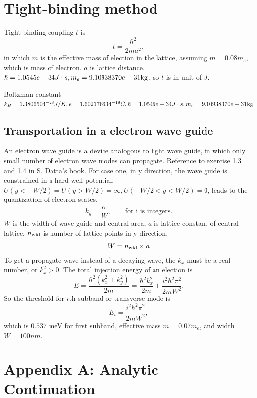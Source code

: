 \documentclass[aps,prb,superscriptaddress]{revtex4-2}
\begin{document}
\section{Tight-binding method}
Tight-binding coupling $t$ is 
\[
t = \frac{\hbar^{2}}{2ma^{2}},
\]
in which $m$ is the effective mass of election in the lattice, assuming $m=0.08m_{e}$, which is mass of electron. $a$ is lattice distance. $\hbar = 1.0545e-34J\cdot s, m_e = 9.10938370e-31\rm{kg}$, so $t$ is in unit of $J$.

Boltzman constant $k_B = 1.3806504^{-23}J/K, e = 1.602176634^{-19}C, \hbar = 1.0545e-34J\cdot s, m_e = 9.10938370e-31\rm{kg}$
\subsection{Transportation in a electron wave guide} 
An electron wave guide is a device analogous to light wave guide, in which only small number of electron wave modes can propagate. Reference to exercise 1.3 and 1.4 in S. Datta's book. For case one, in y direction, the wave guide is constrained in a hard-well potential. $U(y < -W/2) = U(y > W/2) = \infty, U(-W/2 < y < W/2) = 0$, leads to the quantization of electron states.
\begin{equation}
k_{y} = \frac{i\pi}{W}, \qquad \text{for i is integers.}
\end{equation}
$W$ is the width of wave guide and central area, $a$ is lattice constant of central lattice, $n_{\rm{wid}}$ is number of lattice points in y direction.
\begin{equation}
W = n_{\rm{wid}}\times a
\end{equation}
To get a propagate wave instead of a decaying wave, the $k_{x}$ must be a real number, or $k_{x}^{2} > 0$. The total injection energy of an election is
\begin{equation}
E = \frac{\hbar^{2} (k_{x}^{2}+k_{y}^{2})}{2m} = \frac{\hbar^{2} k_{x}^{2}}{2m} + \frac{i^{2}\hbar^{2} \pi^{2}}{2mW^{2}}.
\end{equation}
So the threshold for $i$th subband or transverse mode is
\begin{equation}
E_{i} = \frac{i^{2}\hbar^{2} \pi^{2}}{2mW^{2}},
\end{equation}
which is $0.537$ meV for first subband, effective mass $m=0.07m_{e}$, and width $W = 100nm$.




\clearpage
\section*{Appendix A: Analytic Continuation}
\end{document}
